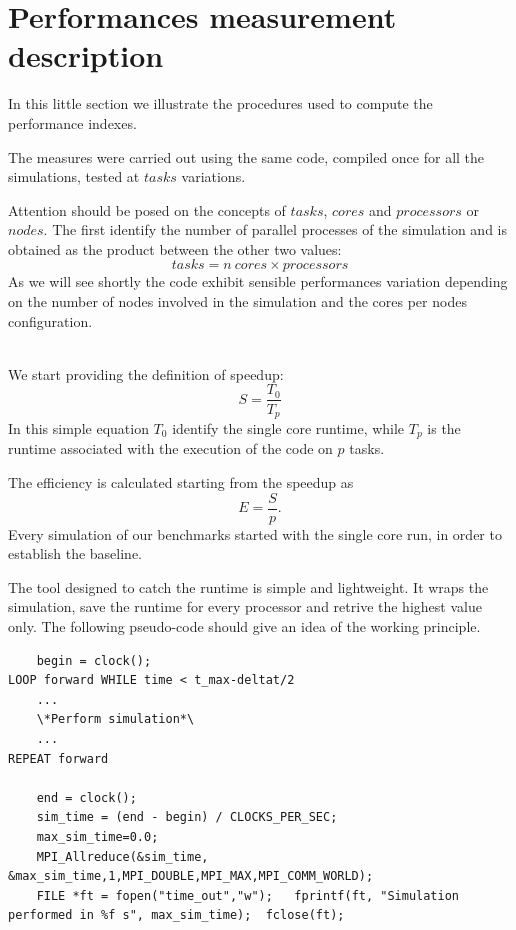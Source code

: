 \section{Performances measurement description}
In this little section we illustrate the procedures used to compute the performance indexes.\par
The measures were carried out using the same code, compiled once for all the simulations, tested at $tasks$ variations.\par
Attention should be posed on the concepts of $tasks$, $cores$ and $processors$ or $nodes$. The first identify the number of parallel processes of the simulation and is obtained as the product between the other two values:
\begin{equation*}
tasks = n~cores \times processors
\end{equation*}
 As we will see shortly the code exhibit sensible performances variation depending on the number of nodes involved in the simulation and the cores per nodes configuration. \\~\par
We start providing the definition of speedup:
\begin{equation*}
S = \frac{T_{0}}{T_{p}}
\end{equation*}
In this simple equation $T_{0}$ identify the single core runtime, while $T_{p}$ is the runtime associated with the execution of the code on $p$ tasks. \par
The efficiency is calculated starting from the speedup as 
\begin{equation*}
E = \frac{S}{p}.
\end{equation*}
Every simulation of our benchmarks started with the single core run, in order to establish the baseline. \par
The tool designed to catch the runtime is simple and lightweight. It wraps the simulation, save the runtime for every processor and retrive the highest value only.
The following pseudo-code should give an idea of the working principle.

\begin{lstlisting}
	begin = clock();
LOOP forward WHILE time < t_max-deltat/2
	...
	\*Perform simulation*\
	...
REPEAT forward

	end = clock();
	sim_time = (end - begin) / CLOCKS_PER_SEC; 
	max_sim_time=0.0;
	MPI_Allreduce(&sim_time, &max_sim_time,1,MPI_DOUBLE,MPI_MAX,MPI_COMM_WORLD); 
	FILE *ft = fopen("time_out","w");	fprintf(ft, "Simulation performed in %f s", max_sim_time); 	fclose(ft);
\end{lstlisting}


